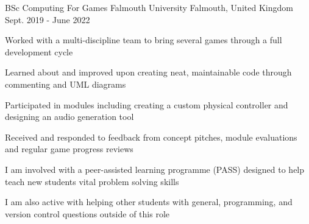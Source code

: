 

\begin{cventries}

  \cventry
    {BSc Computing For Games} %
    {Falmouth University} %
    {Falmouth, United Kingdom} %
    {Sept. 2019 - June 2022} %
    {
      \begin{cvitems} %
        \item Worked with a multi-discipline team to bring several games through a full development cycle
        \item Learned about and improved upon creating neat, maintainable code through commenting and UML diagrams
        \item Participated in modules including creating a custom physical controller and designing an audio generation tool
        \item Received and responded to feedback from concept pitches, module evaluations and regular game progress reviews
        \item I am involved with a peer-assisted learning programme (PASS) designed to help teach new students vital problem solving skills
        \item I am also active with helping other students with general, programming, and version control questions outside of this role
      \end{cvitems}
    }

\end{cventries}